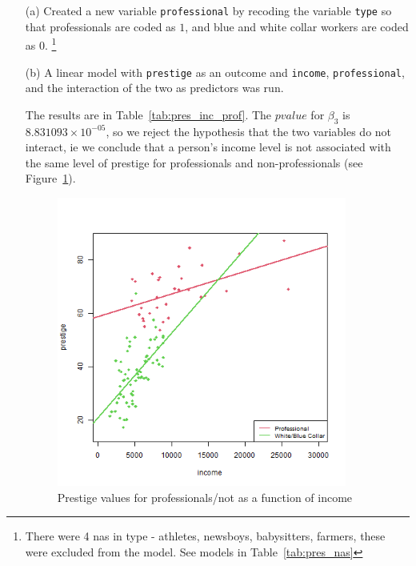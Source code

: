 \documentclass[12pt,letterpaper]{article}
\begin{document}
\begin{enumerate}
	
	\item [(a)]
	Created a new variable \texttt{professional} by recoding the variable \texttt{type} so that professionals are coded as $1$, and blue and white collar workers are coded as $0$.
	\footnote{There were 4 nas in type - athletes, newsboys, babysitters, farmers, these were excluded from the model.  See models in Table~\ref{tab:pres_nas}}
	 
	
	\item [(b)]
	A linear model with \texttt{prestige} as an outcome and \texttt{income}, \texttt{professional}, and the interaction of the two as predictors was run.%

	 

	  The results are in Table~\ref{tab:pres_inc_prof}.    The $pvalue$ for $\beta_3$ is $8.831093\times 10^{-05}$, so we reject the hypothesis that the two variables do not interact, ie we conclude that a person's income level is not associated with the same level of prestige for professionals and non-professionals (see Figure~\ref{fig:pres_inc_prof}).
	  
	  
	    \begin{figure}
		    \includegraphics[width=0.9\textwidth]{Graphics/prestige_interaction.png}
		    \caption{Prestige values for professionals/not as a function of income}
		    \label{fig:pres_inc_prof}
	    \end{figure}


\end{enumerate}
\end{document}
